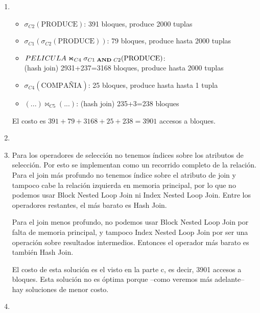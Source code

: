 \documentclass[10pt]{article}
\begin{document}
\begin{enumerate}
\begin{enumerate}
\end{enumerate}

 \item

\begin{itemize}

\item $\sigma_{C2}(\text{PRODUCE})$: 391 bloques, produce 2000 tuplas

\item $\sigma_{C1}(\sigma_{C2}(\text{PRODUCE}))$: 79 bloques, produce hasta 2000 tuplas

\item $PELICULA \Join_{C4} \sigma_{C1 \text{ {\bf AND} } C2}(\text{PRODUCE})$: \\
      (hash join) 2931+237=3168 bloques, produce hasta 2000 tuplas

\item $\sigma_{C4}(\text{COMPAÑIA})$: 25 bloques, produce hasta hasta 1 tupla

\item $(...) \Join_{C5} (...)$: (hash join) 235+3=238 bloques

\end{itemize}

El costo es $391+79+3168+25+238=3901$ accesos a bloques.

 \item

 \item

Para los operadores de selección no tenemos índices sobre los atributos de selección. Por esto
se implementan como un recorrido completo de la relación. Para el join más profundo no tenemos índice
sobre el atributo de join y tampoco cabe la relación izquierda en memoria principal, por lo que no podemos
usar Block Nested Loop Join ni Index Nested Loop Join. Entre los operadores restantes, el más barato
es Hash Join.

Para el join menos profundo, no podemos usar Block Nested Loop Join por falta de memoria principal, y tampoco
Index Nested Loop Join por ser una operación sobre resultados intermedios. Entonces el operador más barato
es también Hash Join.

El costo de esta solución es el visto en la parte c, es decir, 3901 accesos a bloques.
Esta solución no es óptima porque --como veremos más adelante-- hay soluciones de menor costo.

 \item


\end{enumerate}
\end{document}
